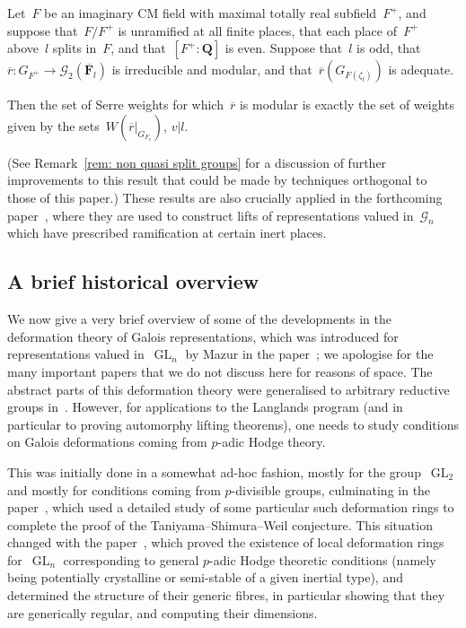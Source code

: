 \documentclass{amsart}
\renewcommand{\mathbb}{\mathbf}
\renewcommand{\ell}{l}
\theoremstyle{definition}
\theoremstyle{remark}
\newcommand{\F}{\FF}
\newcommand{\Q}{\QQ}
\newcommand{\FF}{{\mathbb F}}
\newcommand{\QQ}{{\mathbb Q}}
\newcommand{\cG}{{\mathcal G}}
\newcommand{\Fbar}{\overline{\F}}
\newcommand{\Flbar}{\Fbar_{\ell}}
\DeclareMathOperator{\GL}{GL}
\newcommand{\rbar}{\overline{r}}
\begin{document}
\begin{ithm}\label{thm: weight part of Serre for U2 intro version}
  Let~$F$ be an imaginary CM field with maximal totally real
  subfield~$F^+$, and suppose that~$F/F^+$ is unramified at all finite
  places, that each place of~$F^+$ above~$l$ splits in~$F$, and
  that~$[F^+:\Q]$ is even. Suppose that~$l$ is odd, that
  $\rbar:G_{F^+}\to\cG_2(\Flbar)$ is irreducible and modular, and
  that~$\rbar(G_{F(\zeta_l)})$ is adequate.

Then the set of Serre weights for which~$\rbar$ is modular is exactly
the set of weights given by the sets~$W(\rbar|_{G_{F_v}})$, $v|l$.
  \end{ithm}
(See Remark~\ref{rem: non quasi split groups} for a discussion of
further improvements to this result that could be made by techniques
orthogonal to those of this paper.) %
These results are also crucially applied in the forthcoming paper~\cite{CEGglobalrealisable},
where they are used to construct lifts of representations valued
in~$\cG_n$ which have prescribed ramification at certain inert
places. 


\subsection{A brief historical overview}\label{subsec: historical overview}We
now give a very brief overview of some of the developments in the
deformation theory of Galois representations, which was introduced for
representations valued in~$\GL_n$ by Mazur in the
paper~\cite{MR1012172}; we apologise for the many important papers
that we do not discuss here for reasons of space. The abstract parts
of this deformation theory were generalised to arbitrary reductive
groups in~\cite{MR1643682}. However, for applications to the Langlands
program (and in particular to proving automorphy lifting theorems),
one needs to study conditions on Galois deformations coming from
$p$-adic Hodge theory.

This was initially done in a somewhat ad-hoc fashion, mostly for the
group~$\GL_2$ and mostly for conditions coming from $p$-divisible
groups, culminating in the paper~\cite{MR1839918}, which used a
detailed study of some particular such deformation rings to complete
the proof of the Taniyama--Shimura--Weil conjecture. This situation
changed with the paper~\cite{MR2373358}, which proved the existence of
local deformation rings for~$\GL_n$ corresponding to general $p$-adic
Hodge theoretic conditions (namely being potentially crystalline or
semi-stable of a given inertial type), and determined the structure of
their generic fibres, in particular showing that they are generically
regular, and computing their dimensions.
\end{document}
